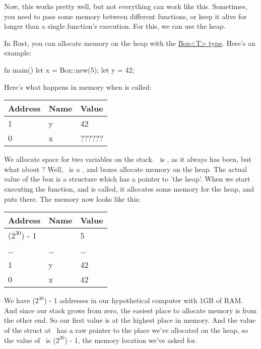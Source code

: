 Now, this works pretty well, but not everything can work like this. Sometimes, you need to pass some memory between different 
functions, or keep it alive for longer than a single function's execution. For this, we can use the heap.

\blank

In Rust, you can allocate memory on the heap with the \href{https://doc.rust-lang.org/std/boxed/}{Box<T> type}. Here's an example:

\begin{rustc}
fn main() {
    let x = Box::new(5);
    let y = 42;
}
\end{rustc}

Here's what happens in memory when  is called:

\begin{table}[H]
  \begin{tabular}{|l|l|l|}
    \hline
    \textbf{Address} & \textbf{Name} & \textbf{Value} \\
    \hline
    1 & y & 42 \\
    \hline
    0 & x & ?????? \\
    \hline
  \end{tabular}
\end{table}

We allocate space for two variables on the stack. \y\ is , as it always has been, but what about \x? Well, \x\ is a 
, and boxes allocate memory on the heap. The actual value of the box is a structure which has a pointer to 'the heap'. 
When we start executing the function, and  is called, it allocates some memory for the heap, and puts  there. 
The memory now looks like this:

\begin{table}[H]
  \begin{tabular}{|l|l|l|}
    \hline
    \textbf{Address} & \textbf{Name} & \textbf{Value} \\
    \hline
    ($2^{30}$) - 1 & & 5 \\
    \hline
    \ldots & \ldots & \ldots \\
    \hline
    1 & y & 42 \\
    \hline
    0 & x & 42 \\
    \hline
  \end{tabular}
\end{table}

We have ($2^{30}$) - 1 addresses in our hypothetical computer with 1GB of RAM. And since our stack grows from zero, the easiest place 
to allocate memory is from the other end. So our first value is at the highest place in memory. And the value of the struct at \x\ has a 
raw pointer to the place we've allocated on the heap, so the value of \x\ is ($2^{30}$) - 1, the memory location we've asked for.

